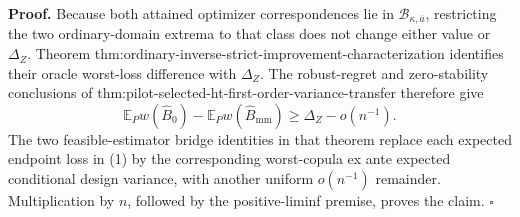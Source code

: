 \textbf{Proof.}
Because both attained optimizer correspondences lie in \(\mathcal B_{\kappa,\overline a}\), restricting the two ordinary-domain extrema to that class does not change either value or \(\Delta_Z\).  Theorem thm:ordinary-inverse-strict-improvement-characterization identifies their oracle worst-loss difference with \(\Delta_Z\).  The robust-regret and zero-stability conclusions of thm:pilot-selected-ht-first-order-variance-transfer therefore give
\[
\mathbb E_Pw(\widehat B_0)-\mathbb E_Pw(\widehat B_{\mathrm{mm}})
\ge\Delta_Z-o(n^{-1}). \tag{1}
\]
The two feasible-estimator bridge identities in that theorem replace each expected endpoint loss in (1) by the corresponding worst-copula ex ante expected conditional design variance, with another uniform \(o(n^{-1})\) remainder.  Multiplication by \(n\), followed by the positive-liminf premise, proves the claim. \(\square\)
